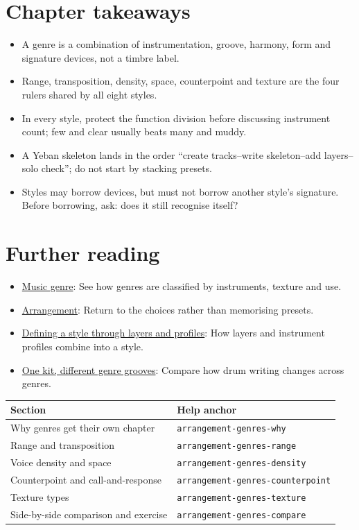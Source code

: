 \section{Chapter takeaways}
\label{sec:genres-takeaways}

\begin{itemize}
\item A genre is a combination of instrumentation, groove, harmony, form and signature devices, not a timbre label.
\item Range, transposition, density, space, counterpoint and texture are the four rulers shared by all eight styles.
\item In every style, protect the function division before discussing instrument count; few and clear usually beats many and muddy.
\item A Yeban skeleton lands in the order ``create tracks--write skeleton--add layers--solo check''; do not start by stacking presets.
\item Styles may borrow devices, but must not borrow another style's signature. Before borrowing, ask: does it still recognise itself?
\end{itemize}

\section{Further reading}
\label{sec:11-genres-further-reading}
\begin{itemize}
  \item \href{https://en.wikipedia.org/wiki/Music_genre}{Music genre}: See how genres are classified by instruments, texture and use.
  \item \href{https://en.wikipedia.org/wiki/Arrangement}{Arrangement}: Return to the choices rather than memorising presets.
  \item \href{https://www.youtube.com/watch?v=M6WhsnWIhcM}{Defining a style through layers and profiles}: How layers and instrument profiles combine into a style.
  \item \href{https://www.youtube.com/watch?v=uO4_OuZHh1Q}{One kit, different genre grooves}: Compare how drum writing changes across genres.
\end{itemize}

\begin{helpmapping}
\begin{longtable}{p{}p{}}
\toprule
Section & Help anchor \\
\midrule
Why genres get their own chapter & \texttt{arrangement-genres-why} \\
Range and transposition & \texttt{arrangement-genres-range} \\
Voice density and space & \texttt{arrangement-genres-density} \\
Counterpoint and call-and-response & \texttt{arrangement-genres-counterpoint} \\
Texture types & \texttt{arrangement-genres-texture} \\
Side-by-side comparison and exercise & \texttt{arrangement-genres-compare} \\
\bottomrule
\end{longtable}
\end{helpmapping}

